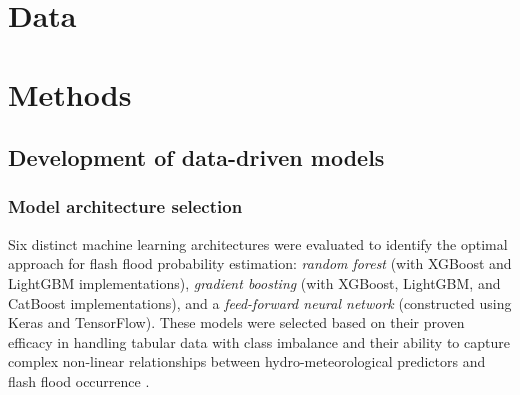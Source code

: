 \section{Data}
\label{data_driven_flash_floods_short_medium_range_data}


\section{Methods}
\label{data_driven_flash_floods_short_medium_range_methods}

\subsection{Development of data-driven models}

\subsubsection{Model architecture selection}

Six distinct machine learning architectures were evaluated to identify the optimal approach for flash flood probability estimation: \textit{random forest} (with XGBoost and LightGBM implementations), \textit{gradient boosting} (with XGBoost, LightGBM, and CatBoost implementations), and a \textit{feed-forward neural network} (constructed using Keras and TensorFlow). These models were selected based on their proven efficacy in handling tabular data with class imbalance and their ability to capture complex non-linear relationships between hydro-meteorological predictors and flash flood occurrence \citep{Shwartz-Ziv_2022}.

